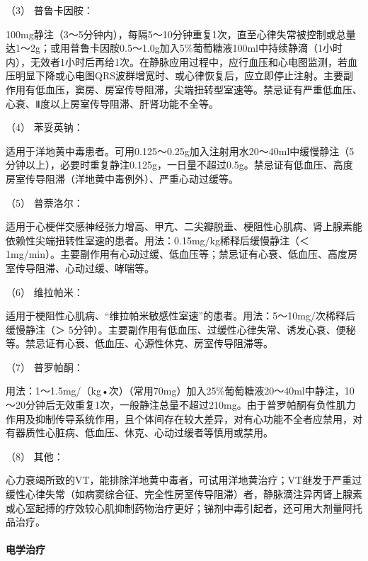 \hypertarget{text00292.htmlux5cux23CHP10-2-5-3-1-1-3}{}
（3） 普鲁卡因胺：

100mg静注（3～5分钟内），每隔5～10分钟重复1次，直至心律失常被控制或总量达1～2g；或用普鲁卡因胺0.5～1.0g加入5\%葡萄糖液100ml中持续静滴（1小时内），无效者1小时后再给1次。在静脉应用过程中，应行血压和心电图监测，若血压明显下降或心电图QRS波群增宽时、或心律恢复后，应立即停止注射。主要副作用有低血压，窦房、房室传导阻滞，尖端扭转型室速等。禁忌证有严重低血压、心衰、Ⅱ度以上房室传导阻滞、肝肾功能不全等。

\hypertarget{text00292.htmlux5cux23CHP10-2-5-3-1-1-4}{}
（4） 苯妥英钠：

适用于洋地黄中毒患者。可用0.125～0.25g加入注射用水20～40ml中缓慢静注（5分钟以上），必要时重复静注0.125g，一日量不超过0.5g。禁忌证有低血压、高度房室传导阻滞（洋地黄中毒例外）、严重心动过缓等。

\hypertarget{text00292.htmlux5cux23CHP10-2-5-3-1-1-5}{}
（5） 普萘洛尔：

适用于心梗伴交感神经张力增高、甲亢、二尖瓣脱垂、梗阻性心肌病、肾上腺素能依赖性尖端扭转性室速的患者。用法：0.15mg/kg稀释后缓慢静注（＜
1mg/min）。主要副作用有心动过缓、低血压等；禁忌证有心衰、低血压、高度房室传导阻滞、心动过缓、哮喘等。

\hypertarget{text00292.htmlux5cux23CHP10-2-5-3-1-1-6}{}
（6） 维拉帕米：

适用于梗阻性心肌病、“维拉帕米敏感性室速”的患者。用法：5～10mg/次稀释后缓慢静注（＞
5分钟）。主要副作用有低血压、过缓性心律失常、诱发心衰、便秘等。禁忌证有心衰、低血压、心源性休克、房室传导阻滞等。

\hypertarget{text00292.htmlux5cux23CHP10-2-5-3-1-1-7}{}
（7） 普罗帕酮：

用法：1～1.5mg/（kg•次）（常用70mg）加入25\%葡萄糖液20～40ml中静注，10～20分钟后无效重复1次，一般静注总量不超过210mg。由于普罗帕酮有负性肌力作用及抑制传导系统作用，且个体间存在较大差异，对有心功能不全者应禁用，对有器质性心脏病、低血压、休克、心动过缓者等慎用或禁用。

\hypertarget{text00292.htmlux5cux23CHP10-2-5-3-1-1-8}{}
（8） 其他：

心力衰竭所致的VT，能排除洋地黄中毒者，可试用洋地黄治疗；VT继发于严重过缓性心律失常（如病窦综合征、完全性房室传导阻滞）者，静脉滴注异丙肾上腺素或心室起搏的疗效较心肌抑制药物治疗更好；锑剂中毒引起者，还可用大剂量阿托品治疗。

\paragraph{电学治疗}

